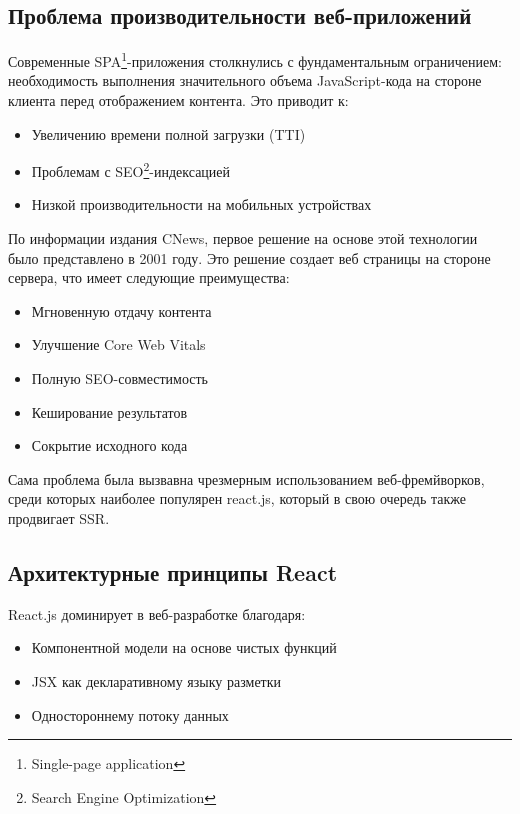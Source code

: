 \subsection{Проблема производительности веб-приложений}
Современные SPA\footnote{Single-page application}-приложения столкнулись с фундаментальным ограничением: необходимость выполнения значительного объема JavaScript-кода на стороне клиента перед отображением контента. %
Это приводит к:
\begin{itemize}
    \item Увеличению времени полной загрузки (TTI)
    \item Проблемам с SEO\footnote{Search Engine Optimization}-индексацией
    \item Низкой производительности на мобильных устройствах
\end{itemize}


По информации издания CNews, первое решение на основе этой технологии было представлено в 2001 году. %
Это решение создает веб страницы на стороне сервера, что имеет следующие преимущества:
\begin{itemize}
    \item Мгновенную отдачу контента
    \item Улучшение Core Web Vitals
    \item Полную SEO-совместимость
    \item Кеширование результатов
    \item Сокрытие исходного кода
\end{itemize}

Сама проблема была вызвавна чрезмерным использованием веб-фремйворков, среди которых наиболее популярен react.js, который в свою очередь также продвигает SSR.

\subsection{Архитектурные принципы React}
React.js доминирует в веб-разработке благодаря:
\begin{itemize}
    \item Компонентной модели на основе чистых функций
    \item JSX как декларативному языку разметки
    \item Одностороннему потоку данных
\end{itemize}

